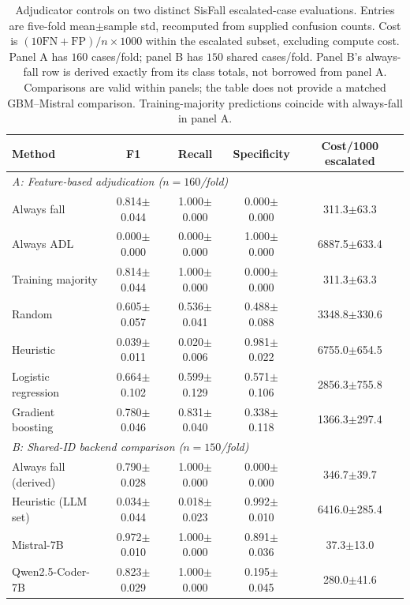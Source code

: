 \begin{table}[!t]
\centering
\caption{Adjudicator controls on two distinct SisFall escalated-case evaluations. Entries are five-fold mean$\pm$sample std, recomputed from supplied confusion counts. Cost is $(10\mathrm{FN}+\mathrm{FP})/n\times1000$ within the escalated subset, excluding compute cost. Panel A has $160$ cases/fold; panel B has $150$ shared cases/fold. Panel B's always-fall row is derived exactly from its class totals, not borrowed from panel A. Comparisons are valid within panels; the table does not provide a matched GBM--Mistral comparison. Training-majority predictions coincide with always-fall in panel A.}
\label{tab:adjudicator}
\begin{tabular}{lcccc}
\toprule
Method & F1 & Recall & Specificity & Cost/1000 escalated \\
\midrule
\multicolumn{5}{l}{\textit{A: Feature-based adjudication ($n=160$/fold)}} \\
Always fall & 0.814$\pm$0.044 & 1.000$\pm$0.000 & 0.000$\pm$0.000 & 311.3$\pm$63.3 \\
Always ADL & 0.000$\pm$0.000 & 0.000$\pm$0.000 & 1.000$\pm$0.000 & 6887.5$\pm$633.4 \\
Training majority & 0.814$\pm$0.044 & 1.000$\pm$0.000 & 0.000$\pm$0.000 & 311.3$\pm$63.3 \\
Random & 0.605$\pm$0.057 & 0.536$\pm$0.041 & 0.488$\pm$0.088 & 3348.8$\pm$330.6 \\
Heuristic & 0.039$\pm$0.011 & 0.020$\pm$0.006 & 0.981$\pm$0.022 & 6755.0$\pm$654.5 \\
Logistic regression & 0.664$\pm$0.102 & 0.599$\pm$0.129 & 0.571$\pm$0.106 & 2856.3$\pm$755.8 \\
Gradient boosting & 0.780$\pm$0.046 & 0.831$\pm$0.040 & 0.338$\pm$0.118 & 1366.3$\pm$297.4 \\
\midrule
\multicolumn{5}{l}{\textit{B: Shared-ID backend comparison ($n=150$/fold)}} \\
Always fall (derived) & 0.790$\pm$0.028 & 1.000$\pm$0.000 & 0.000$\pm$0.000 & 346.7$\pm$39.7 \\
Heuristic (LLM set) & 0.034$\pm$0.044 & 0.018$\pm$0.023 & 0.992$\pm$0.010 & 6416.0$\pm$285.4 \\
Mistral-7B & 0.972$\pm$0.010 & 1.000$\pm$0.000 & 0.891$\pm$0.036 & 37.3$\pm$13.0 \\
Qwen2.5-Coder-7B & 0.823$\pm$0.029 & 1.000$\pm$0.000 & 0.195$\pm$0.045 & 280.0$\pm$41.6 \\
\bottomrule
\end{tabular}
\end{table}